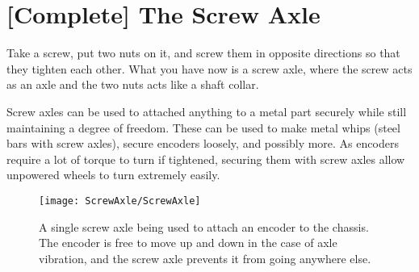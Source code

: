 ﻿\section{[Complete] The Screw Axle}

Take a screw, put two nuts on it, and screw them in opposite directions so that they tighten each other. What you have now is a screw axle, where the screw acts as an axle and the two nuts acts like a shaft collar.

Screw axles can be used to attached anything to a metal part securely while still maintaining a degree of freedom. These can be used to make metal whips (steel bars with screw axles), secure encoders loosely, and possibly more. As encoders require a lot of torque to turn if tightened, securing them with screw axles allow unpowered wheels to turn extremely easily.

\begin{figure}[h]
    \centering
    \texttt{[image: ScrewAxle/ScrewAxle]}
    \caption{
        A single screw axle being used to attach an encoder to the chassis. The encoder is free to move up and down in the case of axle vibration, and the screw axle prevents it from going anywhere else.
    }
\end{figure}
